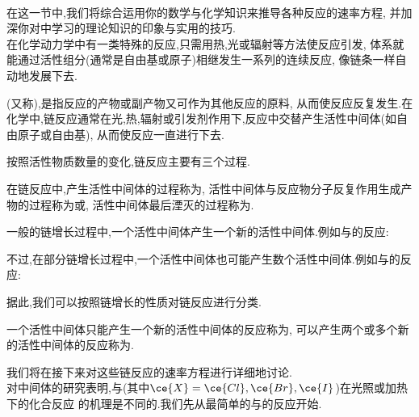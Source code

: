 \documentclass{ctexart}
\begin{document}
\pagestyle{plain}
\noindent{}\vspace{15pt}\\
\indent 在这一节中,我们将综合运用你的数学与化学知识来推导各种反应的速率方程,%
并加深你对中学习的理论知识的印象与实用的技巧.\vspace{12pt}\\
\indent 在化学动力学中有一类特殊的反应,只需用热,光或辐射等方法使反应引发,%
体系就能通过活性组分(通常是自由基或原子)相继发生一系列的连续反应,%
像链条一样自动地发展下去.
\begin{definition}[7D.1.1 链反应]
    (又称),是指反应的产物或副产物又可作为其他反应的原料,%
    从而使反应反复发生.在化学中,链反应通常在光,热,辐射或引发剂作用下,反应中交替产生活性中间体(如自由原子或自由基),%
    从而使反应一直进行下去.
\end{definition}
按照活性物质数量的变化,链反应主要有三个过程.
\begin{definition}[7D.1.2 链反应的过程]
    在链反应中,产生活性中间体的过程称为,%
    活性中间体与反应物分子反复作用生成产物的过程称为或,%
    活性中间体最后湮灭的过程称为.
\end{definition}
一般的链增长过程中,一个活性中间体产生一个新的活性中间体.例如与的反应:
\begin{tightcenter}
\end{tightcenter}
不过,在部分链增长过程中,一个活性中间体也可能产生数个活性中间体.例如与的反应:
\begin{tightcenter}
\end{tightcenter}
据此,我们可以按照链增长的性质对链反应进行分类.
\begin{definition}[7D.1.3 直链反应与支链反应]
    一个活性中间体只能产生一个新的活性中间体的反应称为,%
    可以产生两个或多个新的活性中间体的反应称为.
\end{definition}
我们将在接下来对这些链反应的速率方程进行详细地讨论.\vspace{4pt}\\
\indent 对中间体的研究表明,与(其中$\ce{X}=\ce{Cl},\ce{Br},\ce{I}$)在光照或加热下的化合反应%
的机理是不同的.我们先从最简单的与的反应开始.
\end{document}

